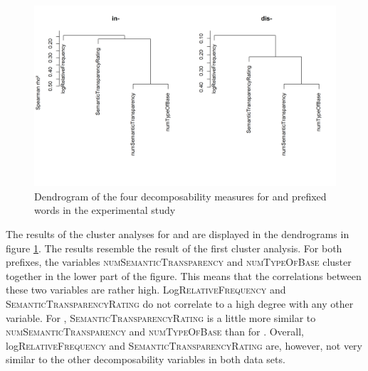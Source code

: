  
 

 

  \begin{figure} [b!]
  	\centering
  	\includegraphics[scale=0.5]{images/Experiment/clusterAnalysisDecomposabilityExpDisAndIn.png}
  	\caption{ Dendrogram of the four decomposability measures for  and prefixed words in the experimental study}
  	\label{fig:cluster experiment dis and in}
  \end{figure}
  
 The results of the cluster analyses for  and  are displayed in the dendrograms in figure \ref{fig:cluster experiment dis and in}. The results resemble the result of the first cluster analysis.
 For both prefixes, the variables \textsc{numSemanticTransparency} and \textsc{numTypeOfBase} cluster together in the lower part of the figure. This means that the correlations between these two variables are rather high. Log\textsc{RelativeFrequency} and \textsc{SemanticTransparencyRating} do not correlate to a high degree with any other variable.
 For , \textsc{SemanticTransparencyRating} is a little more similar to \textsc{numSemanticTransparency} and \textsc{numTypeOfBase} than for . 
 Overall, log\textsc{RelativeFrequency} and \textsc{SemanticTransparencyRating} are, however, not very similar to the other decomposability variables in both data sets. 

